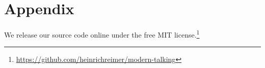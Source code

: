 \appendix
\section{Appendix}

We release our source code online under the free MIT license.\footnote{\url{https://github.com/heinrichreimer/modern-talking}}
